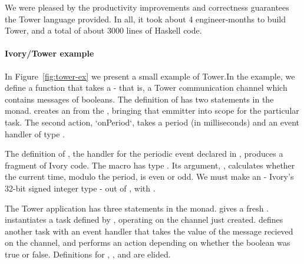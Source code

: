 We were pleased by the productivity improvements and correctness guarantees the
Tower language provided. In all, it took about 4 engineer-months to build Tower,
and a total of about 3000 lines of Haskell code.

\paragraph{Ivory/Tower example}
In Figure~\ref{fig:tower-ex} we present a small example of Tower.In the
example, we define a function  that takes a  - that is, a Tower communication channel which contains messages of
booleans. The definition of  has two statements in the 
monad.  creates an  from
the , bringing that emmitter into scope for the particular task. The
second action, `onPeriod`, takes a period (in milliseconds) and an event handler
of type .

The definition of , the handler for the periodic event declared in
, produces a fragment of Ivory code. The macro  has type
. Its argument, , calculates whether
the current time, modulo the period, is even or odd. We must make an 
- Ivory's 32-bit signed integer type - out of , with
.

The Tower application  has three statements in the  monad.
 gives a fresh .  instantiates a task
defined by , operating on the channel just created.  defines another task with an event handler that takes the value
of the message recieved on the channel, and performs an action depending on
whether the boolean was true or false. Definitions for ,
, and  are elided.


